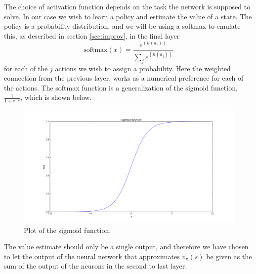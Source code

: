 \documentclass[11pt]{article}
\begin{document}
The choice of activation function depends on the task the
network is supposed to solve.
In our case we wish to learn a policy and estimate the value of a state.
The policy is a probability distribution, and we will be using a softmax
to emulate this, as described in section \ref{sec:improv}, in the final layer
\begin{equation}
    \text{softmax}(x) = \frac{e^(h(a_i))}{\sum\limits_{j} e^(h(a_j))}
\end{equation}
for each of the $j$ actions we wish to assign a probability.
Here the weighted connection from the previous layer, works as
a numerical preference for each of the actions.
The softmax function is a generalization of the sigmoid function, $\frac{1}{1 + e^{-x}}$,
which is shown below.
\begin{figure}[!h]
    \centering
    \includegraphics[width=15cm]{include/sigmoid.png}
    \caption{Plot of the sigmoid function.}
    \label{fig:softmax}
\end{figure}

The value estimate should only be a single output, and therefore we have chosen to
let the output of the neural network that approximates $v_\pi(s)$ be given
as the sum of the output of the neurons in the second to last layer.
\end{document}
